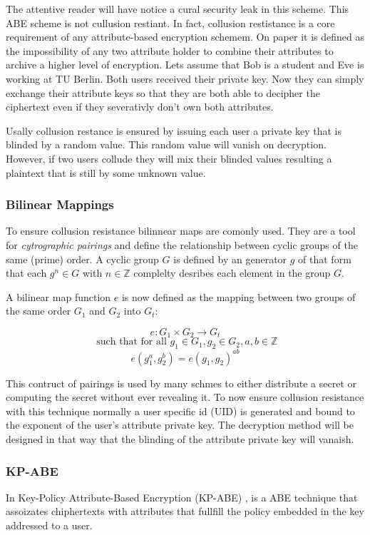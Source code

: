 The attentive reader will have notice a cural security leak in this scheme. This ABE scheme is not cullusion restiant. In fact, collusion restistance is a core requirement of any attribute-based encryption schemem. On paper it is defined as the impossibility of any two attribute holder to combine their attributes to archive a higher level of encryption. Lets assume that Bob is a student and Eve is working at TU Berlin. Both users received their private key. Now they can simply exchange their attribute keys so that they are both able to decipher the ciphertext even if they severativly don't own both attributes.  

Usally collusion restance is ensured by issuing each user a private key that is blinded by a random value. This random value will vanish on decryption. However, if two users collude they will mix their blinded values resulting a plaintext that is still by some unknown value. 

\subsubsection{Bilinear Mappings}
To ensure collusion resistance bilinnear maps are comonly used. They are a tool for \textit{cytrographic pairings} and define the relationship between cyclic groups of the same (prime) order. A cyclic group $G$ is defined by an generator $g$ of that form that each $g^n \in G$ with $n \in \mathbb{Z}$ complelty desribes each element in the group $G$.

A bilinear map function $e$ is now defined as the mapping between two groups of the same order $G_1$ and $G_2$ into $G_t$:

$$ e : G_1 \times G_2 \rightarrow G_t $$
$$\text{ such that for all } g_1 \in G_1, g_2 \in G_2, a, b \in \mathbb{Z}$$
$$e(g_1^a, g_2^b) = e(g_1, g_2)^{ab}$$


This contruct of pairings is used by many schmes to either distribute a secret or computing the secret without ever revealing it. To now ensure collusion resistance with this technique normally a user specific id (UID) is generated and bound to the exponent of the user's attribute private key. The decryption method will be designed in that way that the blinding of the attribute private key will vanaish.   

\subsubsection{KP-ABE}
In Key-Policy Attribute-Based Encryption (KP-ABE) \cite{goyal2006attribute}, is a ABE technique that assoizates chiphertexts with attributes that fullfill the policy embedded in the key addressed to a user. 

